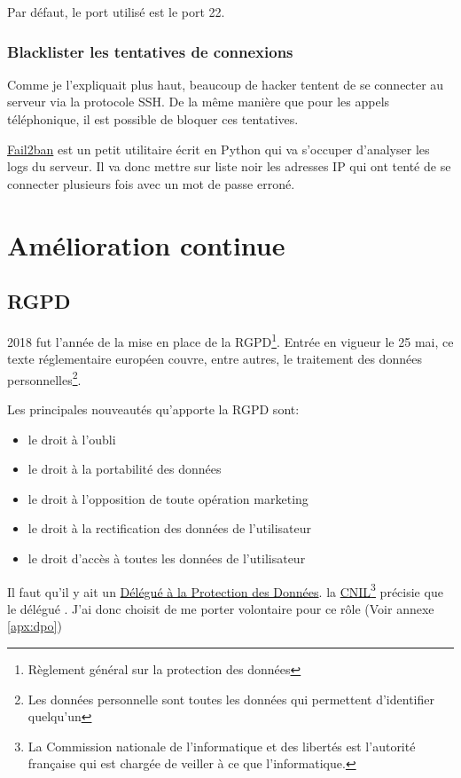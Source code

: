\documentclass[]{report}
\begin{document}
      Par défaut, le port utilisé est le port 22.


    \subsection{Blacklister les tentatives de connexions}

      Comme je l'expliquait plus haut, beaucoup de hacker tentent de se connecter au serveur via la protocole SSH. De la même manière que pour les appels téléphonique, il est possible de bloquer ces tentatives.

       \href{https://www.fail2ban.org/wiki/index.php/Main_Page}{Fail2ban} est un petit utilitaire écrit en Python qui va s’occuper d'analyser les logs du serveur. Il va donc mettre sur liste noir les adresses IP qui ont tenté de se connecter plusieurs fois avec un mot de passe erroné.

\chapter{Amélioration continue}

  \section{RGPD}

    2018 fut l'année de la mise en place de la RGPD\footnote{Règlement général sur la protection des données}. Entrée en vigueur le 25 mai, ce texte réglementaire européen couvre, entre autres, le traitement des données personnelles\footnote{Les données personnelle sont toutes les données qui permettent d'identifier quelqu'un}.

    Les principales nouveautés qu'apporte la RGPD sont:

    \begin{itemize}
      \item le droit à l'oubli
      \item le droit à la portabilité des données
      \item le droit à l'opposition de toute opération marketing
      \item le droit à la rectification des données de l'utilisateur
      \item le droit d'accès à toutes les données de l'utilisateur
    \end{itemize}

    Il faut qu'il y ait un \href{https://www.cnil.fr/fr/devenir-delegue-la-protection-des-donnees}{Délégué à la Protection des Données}. la \href{https://fr.wikipedia.org/wiki/Commission_nationale_de_l%27informatique_et_des_libert%C3%A9s_(France)}{CNIL}\footnote{La Commission nationale de l'informatique et des libertés est l'autorité française qui est chargée de veiller à ce que l’informatique.} précisie que le délégué \textquote{doit être désigné sur la base de ses qualités professionnelles et de ses connaissances spécialisées du droit en matière de protection des données}. J'ai donc choisit de me porter volontaire pour ce rôle (Voir annexe \ref{apx:dpo})
\end{document}

